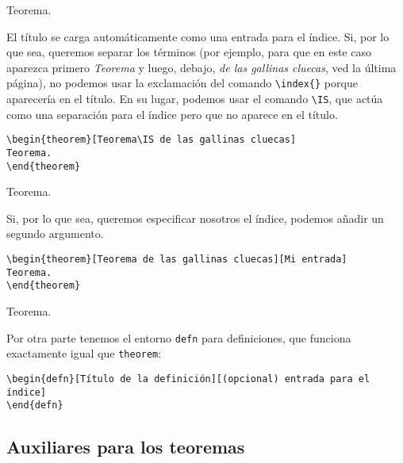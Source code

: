 \documentclass[nochap]{apuntes}
\begin{document}
\begin{theorem}\label{thm:Gallinas}
Teorema.
\end{theorem}

El título se carga automáticamente como una entrada para el índice. Si, por lo que sea, queremos separar los términos (por ejemplo, para que en este caso aparezca primero \textit{Teorema} y luego, debajo, \textit{de las gallinas cluecas}, ved la última página), no podemos usar la exclamación del comando \verb|\index{}| porque aparecería en el título. En su lugar, podemos usar el comando \verb|\IS|, que actúa como una separación para el índice pero que no aparece en el título.

\begin{verbatim}
\begin{theorem}[Teorema\IS de las gallinas cluecas]
Teorema.
\end{theorem}
\end{verbatim}

\begin{theorem}
Teorema.
\end{theorem}

Si, por lo que sea, queremos especificar nosotros el índice, podemos añadir un segundo argumento.

\begin{verbatim}
\begin{theorem}[Teorema de las gallinas cluecas][Mi entrada]
Teorema.
\end{theorem}
\end{verbatim}

\begin{theorem}
Teorema.
\end{theorem}

Por otra parte tenemos el entorno \texttt{defn} para definiciones, que funciona exactamente igual que \texttt{theorem}:

\begin{verbatim}
\begin{defn}[Título de la definición][(opcional) entrada para el índice]
\end{defn}
\end{verbatim}

\begin{defn}
\end{defn}

\subsection{Auxiliares para los teoremas}
\end{document}
